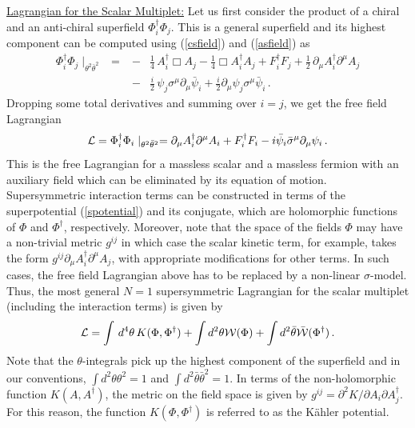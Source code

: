 \noindent\underline{Lagrangian for the Scalar Multiplet:}
\noindent Let us first consider the product of a chiral and an
anti-chiral superfield $\Phi_i^\dagger\Phi_j$. This is a general
superfield and its highest component can be computed using
(\ref{csfield}) and  (\ref{asfield}) as  
\begin{eqnarray}
\Phi^\dagger_i\Phi_j\mid_{\theta^{2}\bar{\theta}^{2}}\,\,\,=
&-&\frac{1}{4}\,A^\dagger_i\Box A_j -\frac{1}{4}\Box A^\dagger_i 
A_j+F^\dagger_i F_j +\frac{1}{2}\,\partial_\mu A^\dagger_i\partial^\mu
A_j \nonumber\\
&-& \frac{i}{2}\,\psi_j\sigma^\mu \partial_\mu \bar{\psi}_{i} +
\frac{i}{2} \partial_\mu \psi_j \sigma^\mu\bar{\psi}_i\,.\nonumber
\end{eqnarray}
Dropping some total derivatives and summing over $i = j$, we get the
free field Lagrangian
$$
{\cal L}=
\Phi^\dagger_i \Phi_i \mid_{\theta^2\bar\theta^2}
=\partial_\mu A^\dagger_i \partial^\mu A_i + F^\dagger_i F_i -i
\bar{\psi}_i \bar{\sigma}^\mu \partial_\mu \psi_i\,.
$$
This is the free Lagrangian for a massless scalar and a massless
fermion with an auxiliary field which can be eliminated by its
equation of motion. Supersymmetric interaction terms can be
constructed in terms of the superpotential (\ref{spotential}) and its
conjugate, which are holomorphic functions of $\Phi$ and
$\Phi^\dagger$, respectively. Moreover, note that the space of the
fields $\Phi$ may have a non-trivial metric $g^{ij}$ in which case the scalar
kinetic term, for example, takes the form $g^{ij}\partial_\mu
A_i^\dagger \partial^\mu A_j$, with appropriate modifications for
other terms. In such cases, the free
field Lagrangian above has to be replaced by a non-linear
$\sigma$-model. Thus, the most general $N=1$ supersymmetric Lagrangian
for the scalar multiplet (including the interaction terms) is given by 
$$
{\cal L}=\int\,d^{4}\theta\,K(\Phi,\Phi^\dagger) +
\int d^{2} \theta {\cal W}(\Phi) + \int d^{2} \bar{\theta} 
\bar{\cal W}(\Phi^\dagger)\,.
$$
Note that the $\theta$-integrals pick up the highest component of the
superfield and in our conventions, $\int d^2 \theta \theta^2=1$ and 
$\int d^2 \bar\theta \bar\theta^2=1$. In terms of the non-holomorphic
function $K(A, A^\dagger)$, the metric on the field space is given by 
$g^{ij}=\partial^2K/\partial A_i\partial A^\dagger_j$. For this
reason, the function $K(\Phi,\Phi^\dagger)$ is referred to as the
K\"{a}hler potential.    

